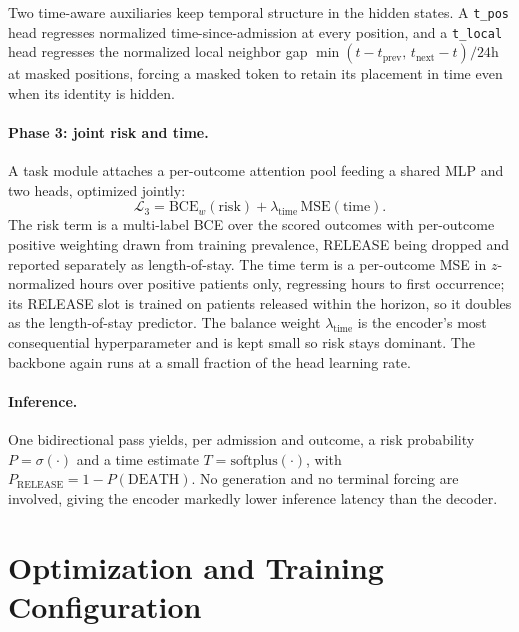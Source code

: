 Two time-aware auxiliaries keep temporal structure in the hidden states. A \texttt{t\_pos} head regresses normalized time-since-admission at every position, and a \texttt{t\_local} head regresses the normalized local neighbor gap $\min(t-t_{\text{prev}},\, t_{\text{next}}-t)/24\text{h}$ at masked positions, forcing a masked token to retain its placement in time even when its identity is hidden.

\paragraph{Phase 3: joint risk and time.}
A task module attaches a per-outcome attention pool feeding a shared MLP and two heads, optimized jointly:
\begin{equation}
\mathcal{L}_3 = \mathrm{BCE}_{w}(\text{risk}) + \lambda_{\text{time}}\,\mathrm{MSE}(\text{time}).
\end{equation}
The risk term is a multi-label BCE over the scored outcomes with per-outcome positive weighting drawn from training prevalence, RELEASE being dropped and reported separately as length-of-stay. The time term is a per-outcome MSE in $z$-normalized hours over positive patients only, regressing hours to first occurrence; its RELEASE slot is trained on patients released within the horizon, so it doubles as the length-of-stay predictor. The balance weight $\lambda_{\text{time}}$ is the encoder's most consequential hyperparameter and is kept small so risk stays dominant. The backbone again runs at a small fraction of the head learning rate.

\paragraph{Inference.}
One bidirectional pass yields, per admission and outcome, a risk probability $P = \sigma(\cdot)$ and a time estimate $T = \mathrm{softplus}(\cdot)$, with $P_{\text{RELEASE}} = 1 - P(\text{DEATH})$. No generation and no terminal forcing are involved, giving the encoder markedly lower inference latency than the decoder.


\section{Optimization and Training Configuration}
\label{sec:method-optimization}

